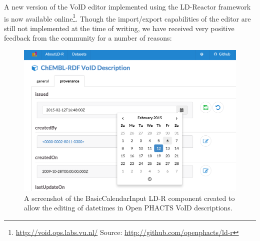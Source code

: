 \documentclass{acm_proc_article-sp}
\begin{document}
A new version of the VoID editor implemented using the LD-Reactor framework is now available online\footnote{\url{http://void.ops.labs.vu.nl/} Source: \url{http://github.com/openphacts/ld-r}}. Though the  import/export capabilities of the editor are still not implemented at the time of writing, we have received very positive feedback from the community for a number of reasons:

\begin{figure}[tb] 
  \includegraphics[width=1\linewidth]{images/ops_ldr}
  \caption{A screenshot of the BasicCalendarInput LD-R component created to allow the editing of datetimes in Open PHACTS VoID descriptions.}
  \label{fig:opsLdr}
\end{figure}
\end{document}
